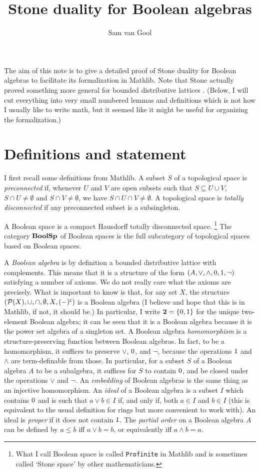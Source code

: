 \documentclass[a4paper]{article}
\title{Stone duality for Boolean algebras}
\author{Sam van Gool}
\begin{document}
\maketitle

The aim of this note is to give a detailed proof of Stone duality for Boolean
algebras \cite{Sto1937BA} to facilitate its formalization in Mathlib. Note that
Stone actually proved something more general for bounded distributive lattices
\cite{Sto1937}. (Below, I will cut everything into very small numbered lemmas
and definitions which is not how I usually like to write math, but it seemed
like it might be useful for organizing the formalization.)

\section{Definitions and statement}
I first recall some definitions from Mathlib. A subset $S$ of a topological
space is \emph{preconnected} if, whenever $U$ and $V$ are open subsets such
that $S \subseteq U \cup V$, $S \cap U \neq \emptyset$ and $S \cap V \neq
\emptyset$, we have $S \cap U \cap V \neq \emptyset$. A topological space is
\emph{totally disconnected} if any preconnected subset is a subsingleton. 

A Boolean space is a compact Hausdorff totally disconnected space.%
\footnote{What I call Boolean space is called \texttt{Profinite} in Mathlib and
is sometimes called `Stone space' by other mathematicians.} The category
$\mathbf{BoolSp}$ of Boolean spaces is the full subcategory of topological spaces based
on Boolean spaces.

A \emph{Boolean algebra} is by definition a bounded distributive lattice with
complements. This means that it is a structure of the form $(A, \vee, \wedge,
0, 1, \neg)$ satisfying a number of axioms. We do not really care what
the axioms are precisely. What is important to know is that, for any set $X$,
the structure $(\mathcal{P}(X), \cup, \cap, \emptyset, X, (-)^{\mathsf{c}})$ is a
Boolean algebra (I believe and hope that this is in Mathlib, if not, it should
be.) In particular, I write $\mathbf{2} = \{ 0, 1 \}$ for the unique
two-element Boolean algebra; it can be seen that it is a Boolean algebra
because it is the power set algebra of a singleton set. A Boolean algebra
\emph{homomorphism} is a structure-preserving function between Boolean
algebras. In fact, to be a homomorphism, it suffices to preserve $\vee$,
$0$, and $\neg$, because the operations $1$ and $\wedge$ are
term-definable from those. In particular, for a subset $S$ of a Boolean algebra
$A$ to be a subalgebra, it suffices for $S$ to contain $0$, and be closed
under the operations $\vee$ and $\neg$. An \emph{embedding} of Boolean algebras
is the same thing as an injective homomorphism. An \emph{ideal} of a Boolean
algebra is a subset $I$ which contains $0$ and is such that $a \vee b \in I$
if, and only if, both $a \in I$ and $b \in I$ (this is equivalent to the usual
definition for rings but more convenient to work with). An ideal is
\emph{proper} if it does not contain $1$. The \emph{partial order} on a
Boolean algebra $A$ can be defined by $a \leq b$ iff $a \vee b = b$, or
equivalently  iff $a \wedge b = a$.
\end{document}
